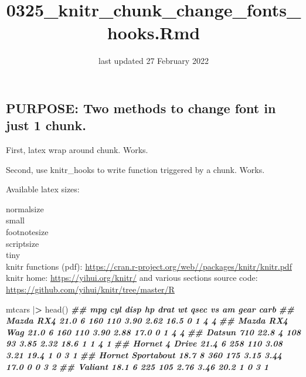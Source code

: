 \documentclass[
  11pt,
]{article}
\title{0325\_knitr\_chunk\_change\_fonts\_hooks.Rmd}
\author{}
\date{last updated 27 February 2022}
\newenvironment{Shaded}{\begin{snugshade}}{\end{snugshade}}
\newcommand{\DocumentationTok}[1]{\textcolor[rgb]{0.56,0.35,0.01}{\textbf{\textit{#1}}}}
\newcommand{\ErrorTok}[1]{\textcolor[rgb]{0.64,0.00,0.00}{\textbf{#1}}}
\newcommand{\FunctionTok}[1]{\textcolor[rgb]{0.00,0.00,0.00}{#1}}
\newcommand{\NormalTok}[1]{#1}
\newcommand{\SpecialCharTok}[1]{\textcolor[rgb]{0.00,0.00,0.00}{#1}}
\begin{document}
\maketitle

{
\setcounter{tocdepth}{2}
\tableofcontents
}
\hypertarget{purpose-two-methods-to-change-font-in-just-1-chunk.}{%
\subsection{PURPOSE: Two methods to change font in just 1
chunk.}\label{purpose-two-methods-to-change-font-in-just-1-chunk.}}

First, latex wrap around chunk. Works.

Second, use knitr\_hooks to write function triggered by a chunk. Works.

Available latex sizes:

\footnotesize

normalsize\\
small\\
footnotesize\\
scriptsize\\
tiny\\

knitr functions (pdf):
\url{https://cran.r-project.org/web//packages/knitr/knitr.pdf} knitr
home: \url{https://yihui.org/knitr/} and various sections source code:
\url{https://github.com/yihui/knitr/tree/master/R}

\normalsize

\begin{Shaded}
\begin{Highlighting}[]
\NormalTok{mtcars }\SpecialCharTok{|}\ErrorTok{\textgreater{}} \FunctionTok{head}\NormalTok{()}
      \DocumentationTok{\#\#                    mpg cyl disp  hp drat   wt qsec vs am gear carb}
      \DocumentationTok{\#\# Mazda RX4         21.0   6  160 110 3.90 2.62 16.5  0  1    4    4}
      \DocumentationTok{\#\# Mazda RX4 Wag     21.0   6  160 110 3.90 2.88 17.0  0  1    4    4}
      \DocumentationTok{\#\# Datsun 710        22.8   4  108  93 3.85 2.32 18.6  1  1    4    1}
      \DocumentationTok{\#\# Hornet 4 Drive    21.4   6  258 110 3.08 3.21 19.4  1  0    3    1}
      \DocumentationTok{\#\# Hornet Sportabout 18.7   8  360 175 3.15 3.44 17.0  0  0    3    2}
      \DocumentationTok{\#\# Valiant           18.1   6  225 105 2.76 3.46 20.2  1  0    3    1}
\end{Highlighting}
\end{Shaded}
\end{document}
